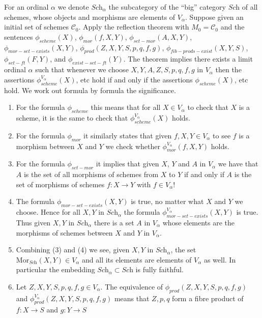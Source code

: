 \medskip\noindent
For an ordinal $\alpha$ we denote $\textit{Sch}_\alpha$ the subcategory
of the ``big'' category $\textit{Sch}$ of all schemes, whose
objects and morphisms are elements of $V_\alpha$.
Suppose given an initial set of schemes $\mathcal{C}_0$.
Apply the reflection theorem with $M_0 = \mathcal{C}_0$
and the sentences
$\phi_{scheme}(X)$,
$\phi_{mor}(f, X, Y)$,
$\phi_{set-mor}(A, X, Y)$,
$\phi_{mor-set-exists}(X, Y)$,
$\phi_{prod}(Z, X, Y, S, p, q, f, g)$,
$\phi_{fib-prods-exist}(X, Y, S)$,
$\phi_{set-ft}(F, Y)$, and
$\phi_{exist-set-ft}(Y)$. The theorem implies
there exists a limit ordinal $\alpha$ such that
whenever we choose $X, Y, A, Z, S, p, q, f, g$ in
$V_\alpha$ then the assertions $\phi_{scheme}^{V_\alpha}(X)$, etc
hold if and only if the assertions $\phi_{scheme}(X)$, etc hold.
We work out formula by formula the significance.
\begin{enumerate}
\item For the formula $\phi_{scheme}$ this means that for
all $X \in V_\alpha$ to check that $X$ is a scheme,
it is the same to check that $\phi_{scheme}^{V_\alpha}(X)$ holds.
\item For the formula $\phi_{mor}$ it similarly states that
given $f, X, Y \in V_\alpha$ to see $f$ is a morphism
between $X$ and $Y$ we check whether
$\phi_{mor}^{V_\alpha}(f, X, Y)$ holds.
\item For the formula $\phi_{set-mor}$ it implies that given $X$, $Y$ and
$A$ in $V_\alpha$ we have that $A$ is the set of all morphisms of schemes
from $X$ to $Y$ if and only if $A$ is the set of morphisms of schemes
$f : X \to Y$ with $f \in V_\alpha$!
\item The formula $\phi_{mor-set-exists}(X, Y)$ is true, no matter
what $X$ and $Y$ we choose.
Hence for all $X, Y$ in $\textit{Sch}_\alpha$ the
formula $\phi_{mor-set-exists}^{V_\alpha}(X, Y)$ is true.
Thus given $X, Y$ in $\textit{Sch}_\alpha$
there is a set $A$ in $V_\alpha$ whose elements are the morphisms
of schemes between $X$ and $Y$ in $V_\alpha$.
\item Combining (3) and (4) we see, given $X, Y$ in $\textit{Sch}_\alpha$,
the set $\text{Mor}_{\textit{Sch}}(X, Y) \in V_\alpha$
and all its elements are elements of $V_\alpha$ as well.
In particular the embedding
$\textit{Sch}_\alpha \subset \textit{Sch}$ is fully faithful.
\item Let $Z, X, Y, S, p, q, f, g \in V_\alpha$.
The equivalence of $\phi_{prod}(Z, X, Y, S, p, q, f, g)$
and $\phi_{prod}^{V_\alpha}(Z, X, Y, S, p, q, f, g)$ means that
$Z, p ,q$ form a fibre product of $f : X \to S$ and $g : Y \to S$

\end{enumerate}
